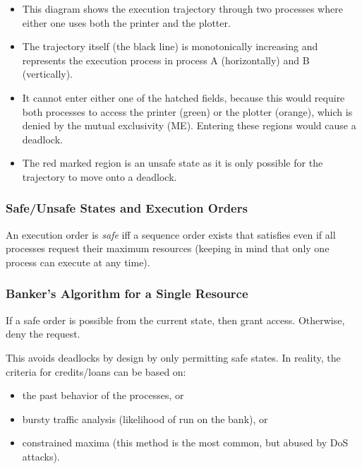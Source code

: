 \documentclass[a4paper, 11pt, accentcolor = tud3b]{tudreport}
\begin{document}
		            \begin{itemize}
		            	\item This diagram shows the execution trajectory through two processes where either one uses both the printer and the plotter.
		            	\item The trajectory itself (the black line) is monotonically increasing and represents the execution process in process A (horizontally) and B (vertically).
		            	\item It cannot enter either one of the hatched fields, because this would require both processes to access the printer (green) or the plotter (orange), which is denied by the mutual exclusivity (ME). Entering these regions would cause a deadlock.
		            	\item The red marked region is an unsafe state as it is only possible for the trajectory to move onto a deadlock.
		            \end{itemize}
	            
	            \subsubsection{Safe/Unsafe States and Execution Orders}
					An execution order is \textit{safe} iff a sequence order exists that satisfies even if all processes request their maximum resources (keeping in mind that only one process can execute at any time).

                \subsubsection{Banker's Algorithm for a Single Resource}
                    If a safe order is possible from the current state, then grant access. Otherwise, deny the request.
                    
                    This avoids deadlocks by design by only permitting safe states. In reality, the criteria for credits/loans can be based on:
                    \begin{itemize}
                    	\item the past behavior of the processes, or
                    	\item bursty traffic analysis (likelihood of run on the bank), or
                    	\item constrained maxima (this method is the most common, but abused by DoS attacks).
                    \end{itemize}
\end{document}

